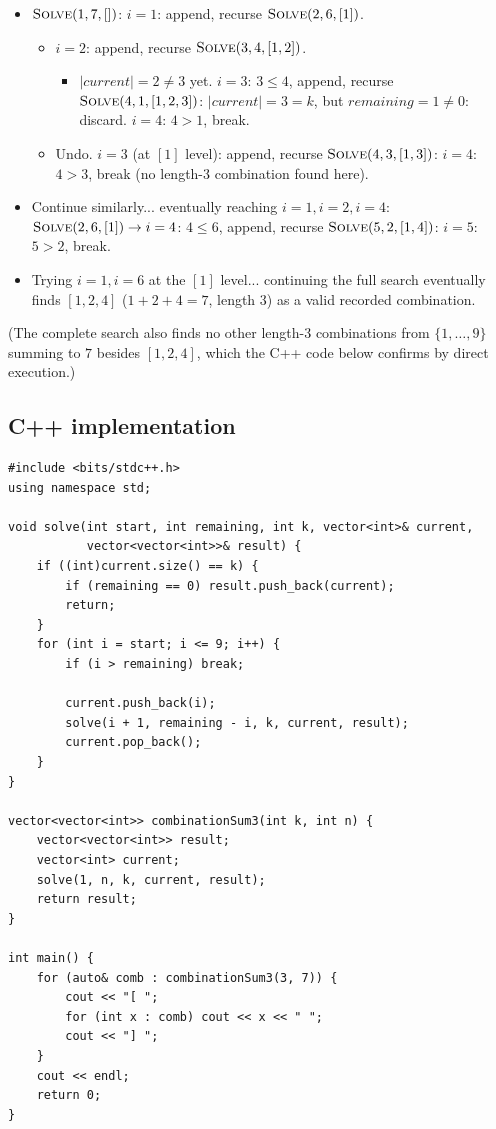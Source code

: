 \begin{itemize}
  \item $\textsc{Solve}(1,7,[])$: $i=1$: append, recurse
        $\textsc{Solve}(2,6,[1])$.
  \begin{itemize}
    \item $i=2$: append, recurse $\textsc{Solve}(3,4,[1,2])$.
    \begin{itemize}
      \item $|\textit{current}|=2 \ne 3$ yet. $i=3$: $3\le4$, append,
            recurse $\textsc{Solve}(4,1,[1,2,3])$: $|\textit{current}|=3=k$,
            but $\textit{remaining}=1\ne0$: discard. $i=4$: $4>1$,
            break.
    \end{itemize}
    \item Undo. $i=3$ (at $[1]$ level): append, recurse
          $\textsc{Solve}(4,3,[1,3])$: $i=4$: $4>3$, break (no length-3
          combination found here).
  \end{itemize}
  \item Continue similarly... eventually reaching $i=1,i=2,i=4$:
        $\textsc{Solve}(2,6,[1])\to i=4$: $4\le6$, append, recurse
        $\textsc{Solve}(5,2,[1,4])$: $i=5$: $5>2$, break.
  \item Trying $i=1, i=6$ at the $[1]$ level... continuing the full
        search eventually finds $[1,2,4]$ ($1+2+4=7$, length $3$) as a
        valid recorded combination.
\end{itemize}

(The complete search also finds no other length-$3$ combinations from
$\{1,\dots,9\}$ summing to $7$ besides $[1,2,4]$, which the C++ code
below confirms by direct execution.)

\subsection*{C++ implementation}

\begin{lstlisting}
#include <bits/stdc++.h>
using namespace std;

void solve(int start, int remaining, int k, vector<int>& current,
           vector<vector<int>>& result) {
    if ((int)current.size() == k) {
        if (remaining == 0) result.push_back(current);
        return;
    }
    for (int i = start; i <= 9; i++) {
        if (i > remaining) break;

        current.push_back(i);
        solve(i + 1, remaining - i, k, current, result);
        current.pop_back();
    }
}

vector<vector<int>> combinationSum3(int k, int n) {
    vector<vector<int>> result;
    vector<int> current;
    solve(1, n, k, current, result);
    return result;
}

int main() {
    for (auto& comb : combinationSum3(3, 7)) {
        cout << "[ ";
        for (int x : comb) cout << x << " ";
        cout << "] ";
    }
    cout << endl;
    return 0;
}
\end{lstlisting}

